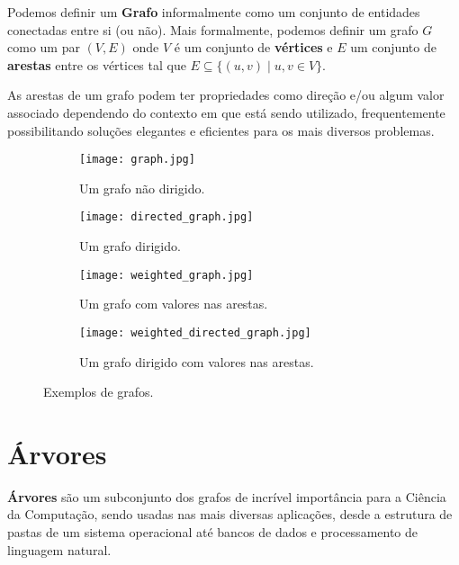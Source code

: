Podemos definir um \textbf{Grafo} informalmente como um conjunto de entidades
conectadas entre si (ou não). Mais formalmente, podemos definir um grafo $G$ como um
par $(V, E)$ onde $V$ é um conjunto de \textbf{vértices} e $E$ um conjunto de
\textbf{arestas} entre os vértices tal que $E \subseteq \{ (u, v) \mid u, v \in V \}$.

As arestas de um grafo podem ter propriedades como direção e/ou algum valor
associado dependendo do contexto em que está sendo utilizado, frequentemente
possibilitando soluções elegantes e eficientes para os mais diversos problemas.

\begin{figure}
  \centering

  \begin{subfigure}{0.4\textwidth}
    \centering
    \texttt{[image: graph.jpg]}
    \caption{Um grafo não dirigido.\label{fig:subfigures:a}}
  \end{subfigure}
  \begin{subfigure}{0.4\textwidth}
    \centering
    \texttt{[image: directed\_graph.jpg]}
    \caption{Um grafo dirigido.\label{fig:subfigures:b}}
  \end{subfigure}

  \begin{subfigure}{0.4\textwidth}
    \centering
    \texttt{[image: weighted\_graph.jpg]}
    \caption{Um grafo com valores nas arestas.\label{fig:subfigures:c}}
  \end{subfigure}
  \begin{subfigure}{0.4\textwidth}
    \centering
    \texttt{[image: weighted\_directed\_graph.jpg]}
    \caption{Um grafo dirigido com valores nas arestas.\label{fig:subfigures:d}}
  \end{subfigure}

  \caption{Exemplos de grafos.\label{fig:subfigures}}
\end{figure}

\section{Árvores}

\textbf{Árvores} são um subconjunto dos grafos de incrível importância para a
Ciência da Computação, sendo usadas nas mais diversas aplicações, desde a estrutura
de pastas de um sistema operacional até bancos de dados e processamento de
linguagem natural.

